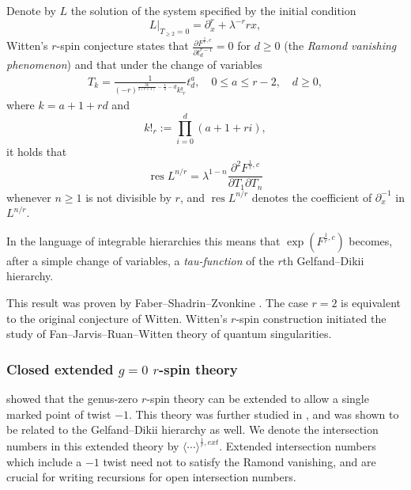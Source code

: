 \documentclass[11pt]{amsart}
\theoremstyle{definition}
\theoremstyle{remark}
\newcommand{\<}{\left<}
\renewcommand{\>}{\right>}
\DeclareMathOperator{\res}{res}
\numberwithin{equation}{section}
\begin{document}
Denote %
by $L$ the solution of the system specified by the initial %
condition
\begin{equation}\label{eq:init_cond_L}
L|_{T_{\geq 2}=0}=\partial_x^r+\lambda^{-r}rx,
\end{equation}
Witten's %
$r$-spin conjecture states that $\frac{\partial F^{\frac{1}{r},c}}{\partial t^{r-1}_d}=0$ for $d\geq 0$ (the \emph{Ramond vanishing phenomenon}) and that under the change of variables
\begin{gather}\label{eq:closed r-spin change of variables}
T_k=\frac{1}{(-r)^{\frac{3k}{2(r+1)}-\frac{1}{2}-d}k!_r}t^a_d,\quad 0\le a\le r-2,\quad d\ge 0,
\end{gather}
where $k=a+1+rd$ and
$$
k!_r:=\prod_{i=0}^d(a+1+ri),
$$
it holds that
$$
\res L^{n/r}=\lambda^{1-n}\frac{\partial^2 F^{\frac{1}{r},c}}{\partial T_1\partial T_n}
$$
whenever $n\geq 1$ is not divisible by $r$, and $\res L^{n/r}$ denotes the coefficient of $\partial_x^{-1}$ in $L^{n/r}$.

In the language of %
integrable hierarchies this %
means that  $\exp(F^{\frac{1}{r},c})$ becomes, after a simple change of variables, a \emph{tau-function} of the $r$th Gelfand--Dikii hierarchy.  


This result %
was proven by %
Faber--Shadrin--Zvonkine \cite{FSZ10}.  The case $r=2$ is equivalent to the original conjecture of Witten. Witten's $r$-spin construction initiated the study of Fan--Jarvis--Ruan--Witten \cite{FJR} theory of quantum singularities.

\subsubsection{Closed extended $g=0$ $r$-spin theory}
\cite{JKV2} showed that the genus-zero $r$-spin theory can be extended to allow a single marked point of twist $-1$. This theory was further studied in \cite{BCT_Closed_Extended}, and was shown to be related to the Gelfand--Dikii hierarchy as well. We denote the intersection numbers in this extended theory by $\langle\cdots\rangle^{\frac{1}{r},ext}.$ Extended intersection numbers which include a $-1$ twist need not to satisfy the %
Ramond vanishing, and %
are crucial for writing recursions for open intersection numbers.
\end{document}
